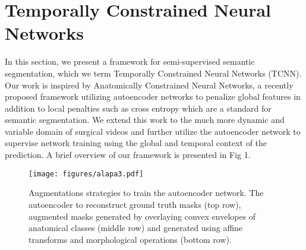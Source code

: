 \documentclass[twoside, print]{ieeecolor_arxiv}
\begin{document}
\section{Temporally Constrained Neural Networks }

In this section, we present a framework for semi-supervised semantic segmentation, which we term Temporally Constrained Neural Networks (TCNN). Our work is inspired by Anatomically Constrained Neural Networks\cite{acnn}, a recently proposed framework utilizing autoencoder\cite{denoisingautoencoders} networks to penalize global features in addition to local penalties such as cross entropy which are a standard for semantic segmentation. We extend this work to the much more dynamic and variable domain of surgical videos and further utilize the autoencoder network to supervise network training using the global and temporal context of the prediction. A brief overview of our framework is presented in Fig 1. 


\begin{figure}[]
\centerline{\texttt{[image: figures/alapa3.pdf]}}
\caption{Augmentations strategies to train the autoencoder network.  The autoencoder to reconstruct ground truth masks (top row), augmented masks generated by overlaying convex envelopes of anatomical classes (middle row) and generated using affine transforms and morphological operations (bottom row).}
\label{figI}
\end{figure}  
\end{document}
